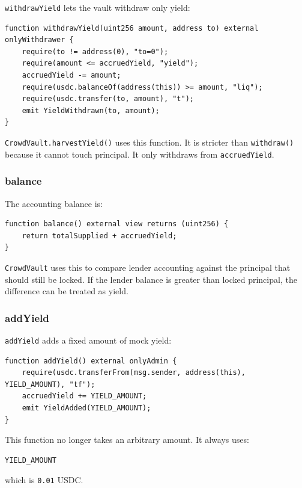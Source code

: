 \documentclass[11pt,a4paper]{article}
\begin{document}
\texttt{withdrawYield} lets the vault withdraw only yield:

\begin{lstlisting}
function withdrawYield(uint256 amount, address to) external onlyWithdrawer {
    require(to != address(0), "to=0");
    require(amount <= accruedYield, "yield");
    accruedYield -= amount;
    require(usdc.balanceOf(address(this)) >= amount, "liq");
    require(usdc.transfer(to, amount), "t");
    emit YieldWithdrawn(to, amount);
}
\end{lstlisting}

\texttt{CrowdVault.harvestYield()} uses this function. It is stricter than \texttt{withdraw()} because it cannot touch principal. It only withdraws from \texttt{accruedYield}.

\subsubsection{balance}

The accounting balance is:

\begin{lstlisting}
function balance() external view returns (uint256) {
    return totalSupplied + accruedYield;
}
\end{lstlisting}

\texttt{CrowdVault} uses this to compare lender accounting against the principal that should still be locked. If the lender balance is greater than locked principal, the difference can be treated as yield.

\subsubsection{addYield}

\texttt{addYield} adds a fixed amount of mock yield:

\begin{lstlisting}
function addYield() external onlyAdmin {
    require(usdc.transferFrom(msg.sender, address(this), YIELD_AMOUNT), "tf");
    accruedYield += YIELD_AMOUNT;
    emit YieldAdded(YIELD_AMOUNT);
}
\end{lstlisting}

This function no longer takes an arbitrary amount. It always uses:

\begin{lstlisting}
YIELD_AMOUNT
\end{lstlisting}

which is \texttt{0.01} USDC.
\end{document}
